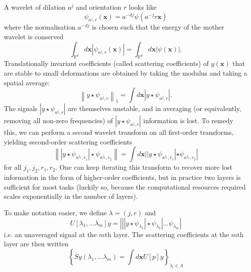 \documentclass[twocolumn, openany, oneside, article]{memoir}
\begin{document}
A wavelet of dilation $a^j$ and orientation $r$ looks like
\begin{equation}
  \psi_{a^j, r}(\bm{x}) = a^{-dj} \psi(a^{-j}r\bm{x})
\end{equation}
where the normalisation $a^{-dj}$ is chosen such that the energy of the mother wavelet is
conserved
\begin{equation}
  \int_{\mathbb{R}^d} d\bm{x} | \psi_{a^j, r}(\bm{x}) | = \int_{\mathbb{R}^d} d\bm{x} | \psi(\bm{x}) |.
\end{equation}
Translationally invariant coefficients (called scattering coefficients) of $y(\bm{x})$ that are stable to small deformations are obtained by taking the modulus and taking a spatial average:
\begin{equation}
    \left\| y \star \psi_{a^j, r} \right\|_{1} = \int d\bm{x} |y \star \psi_{a^j, r}|.
\end{equation}
The signals $|y \star \psi_{a^j, r}|$ are themselves unstable, and in averaging (or equivalently, removing all non-zero
frequencies) of $|y \star \psi_{a^j, r}|$ information is lost. To remedy this, we can perform a second wavelet
transform on all first-order transforms, yielding second-order scattering coefficients
\begin{equation}
  \left\| |y \star \psi_{a^{j_1}, r_1}| \star \psi_{a^{j_2}, r_2} \right\| = \int d\bm{x} | |y \star \psi_{a^{j_1}, r_1}| \star \psi_{a^{j_2}, r_2} |
\end{equation}
for all $j_1, j_2, r_1, r_2$. One can keep iterating this transform to recover more lost information in the form of
higher-order coefficients, but in practice two layers is sufficient for most tasks (luckily so, because the
computational resources required scales exponentially in the number of layers).

To make notation easier, we define $\lambda = (j, r)$ and
\begin{equation}
  U[\lambda_1, \dots \lambda_m]y = \left| \left| \left| y \star \psi_{\lambda_1} \right| \star \psi_{\lambda_2} \right|
  \dots \psi_{\lambda_m} \right|
\end{equation}
i.e. an unaveraged signal at the $m$th layer. The scattering coefficients
at the $m$th layer are then written
\begin{equation}
  \left\{ \bar{S}y(\lambda_1, \dots \lambda_m) = \int d\bm{x} U[p]y \right\}_{\lambda_i \in \Lambda}
\end{equation}
\end{document}
